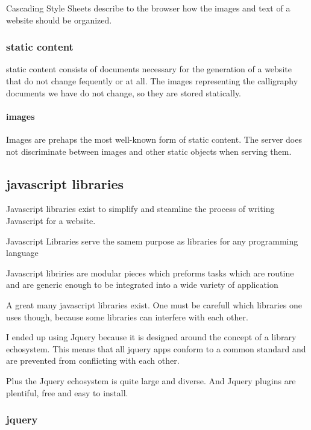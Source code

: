 {Cascading Style Sheets describe to the browser how the images and text of a website should be organized.  




\subsubsection{static content}

static content consists of documents necessary for the generation of a website that do not change fequently or at all.  The images representing the calligraphy documents we have do not change, so they are stored statically.

\paragraph{images}

Images are prehaps the most well-known form of static content.  The server does not discriminate between images and other static objects when serving them.


\subsection{javascript libraries}

Javascript libraries exist to simplify and steamline the process of writing Javascript for a website.

Javascript Libraries serve the samem purpose as libraries for any programming language

Javascript libriries are modular pieces which preforms tasks which are routine and are generic enough to be integrated into a wide variety of application

A great many javascript libraries exist.  One must be carefull which libraries one uses though, because some libraries can interfere with each other.  

I ended up using Jquery because it is designed around the concept of a library echosystem.  This means that all jquery apps conform to a common standard and are prevented from conflicting with each other.

Plus the Jquery echosystem is quite large and diverse.  And Jquery plugins are plentiful, free and easy to install.


\subsubsection{jquery}

}
